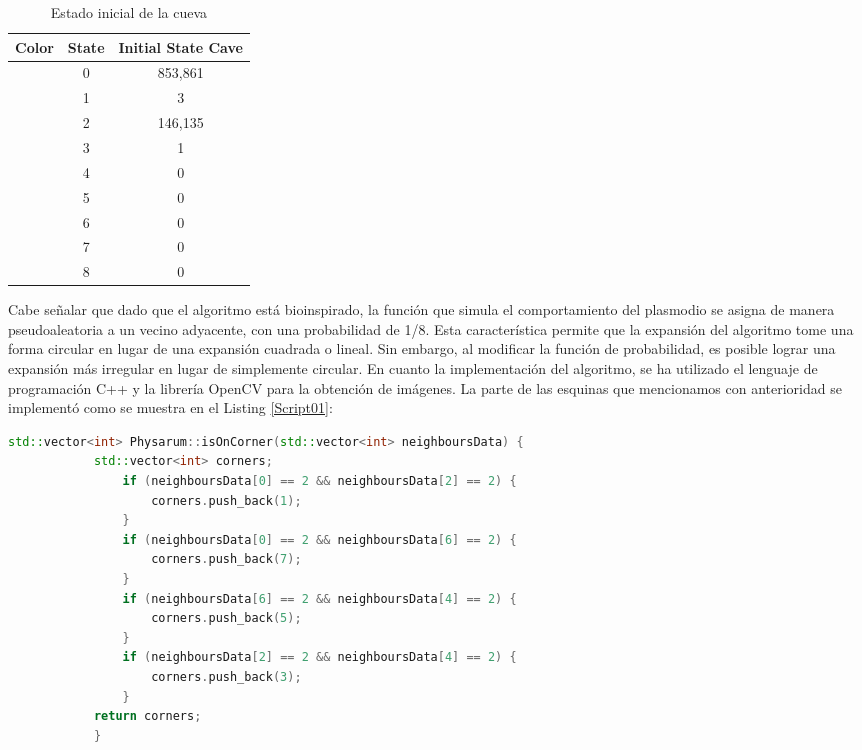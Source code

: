         \begin{table}[h]
            \begin{center}
                \begin{tabular}{|c|c|c|}
                    \hline
                    \textbf{Color}&\textbf{State}&\textbf{Initial State Cave} \\
                    \hline
                    \cellcolor{blue} & 0 & 853,861  \\
                    \cellcolor{royalblue} & 1 & 3 \\
                    \cellcolor{red} & 2 & 146,135 \\
                    \cellcolor{black} & 3 & 1 \\
                    \cellcolor{yellow} & 4 & 0 \\
                    \cellcolor{darkgreen} & 5 & 0 \\
                    \cellcolor{lemon} & 6 & 0 \\
                    \cellcolor{darkgray} & 7 & 0 \\
                    \cellcolor{green} & 8 & 0 \\
                    \hline
                \end{tabular}
            \end{center}
            \caption{Estado inicial de la cueva}
            \label{tab:estados03}
        \end{table}
        Cabe se\~nalar que dado que el algoritmo est\'a bioinspirado, la funci\'on que simula el comportamiento del plasmodio 
            se asigna de manera pseudoaleatoria a un vecino adyacente, con una probabilidad de 1/8. Esta caracter\'istica permite 
            que la expansi\'on del algoritmo tome una forma circular en lugar de una expansi\'on cuadrada o lineal. Sin embargo, al 
            modificar la funci\'on de probabilidad, es posible lograr una expansi\'on m\'as irregular en lugar de simplemente circular.
        \clearpage
        En cuanto la implementaci\'on del algoritmo, se ha utilizado el lenguaje de programaci\'on C++ y la librer\'ia OpenCV para la 
            obtenci\'on de im\'agenes. La parte de las esquinas que mencionamos con anterioridad se implement\'o como se muestra en el Listing \ref{Script01}: 
        \begin{lstlisting}[language={C++}, caption={Implementaci\'on del problema de las esquinas}, label={Script01}]
            std::vector<int> Physarum::isOnCorner(std::vector<int> neighboursData) {
            std::vector<int> corners;
                if (neighboursData[0] == 2 && neighboursData[2] == 2) {
                    corners.push_back(1);
                }
                if (neighboursData[0] == 2 && neighboursData[6] == 2) {
                    corners.push_back(7);
                }
                if (neighboursData[6] == 2 && neighboursData[4] == 2) {
                    corners.push_back(5);
                }
                if (neighboursData[2] == 2 && neighboursData[4] == 2) {
                    corners.push_back(3);
                }
            return corners;
            }
        \end{lstlisting}
